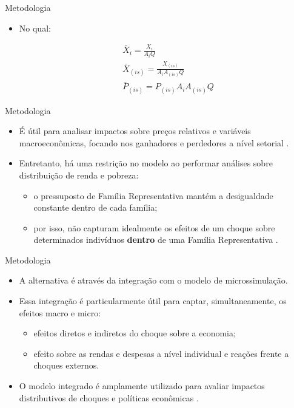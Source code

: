 \documentclass[10pt]{sintefbeamer}
\begin{document}
\begin{frame}{Metodologia}
	\begin{itemize}
		\item No qual:
		
		\begin{align*}
			&\bar{X}_i = \frac{X_i}{A_iQ} \\
			&\bar{X}_{(is)} = \frac{X_{(is)}}{A_iA_{(is)}Q} \\
			&\bar{P}_{(is)} = P_{(is)}A_iA_{(is)}Q
		\end{align*}
	\end{itemize}
\end{frame}


\begin{frame}{Metodologia}
	\begin{itemize}[<+->]
		\item É útil para analisar impactos sobre preços relativos e variáveis macroeconômicas, focando nos ganhadores e perdedores a nível setorial \cite{anderson20, tibertietal17}.
		
		\item Entretanto, há uma restrição no modelo ao performar análises sobre distribuição de renda e pobreza:
		
		\begin{itemize}
			\item o pressuposto de Família Representativa mantém a desigualdade constante dentro de cada família;
			
			\item por isso, não capturam idealmente os efeitos de um choque sobre determinados indivíduos \textbf{dentro} de uma Família Representativa \cite{colombo08}.
		\end{itemize}
	\end{itemize}
\end{frame}

\begin{frame}{Metodologia}
	\begin{itemize}[<+->]
		\item A alternativa é através da integração com o modelo de microssimulação.
		
		\item Essa integração é particularmente útil para captar, simultaneamente, os efeitos macro e micro:
		
		\begin{itemize}
			\item efeitos diretos e indiretos do choque sobre a economia;
			\item efeito sobre as rendas e despesas a nível individual e reações frente a choques externos.
		\end{itemize}
		
		\item O modelo integrado é amplamente utilizado para avaliar impactos distributivos de choques e políticas econômicas \cite{raihan10, cicowiez16, mbanda21}.
	\end{itemize}
\end{frame}
\end{document}
